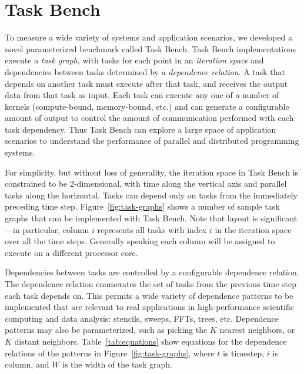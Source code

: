 \section{Task Bench}
\label{sec:task-bench}

To measure a wide variety of
systems and application scenarios, we developed a novel
parameterized benchmark called Task Bench. Task Bench
implementations execute a \emph{task graph}, with tasks for each point
in an \emph{iteration space} and dependencies between tasks determined
by a \emph{dependence relation}. A task that depends on another task
must execute after that task, and receives the output data from that
task as input. Each task can execute any one of a
number of kernels (compute-bound, memory-bound, etc.) and can generate
a configurable amount of output to control the amount of communication
performed with each task dependency. Thus Task Bench can explore a large space of application scenarios to
understand the performance of parallel and
distributed programming systems.

For simplicity, but without loss of generality, the iteration space in
Task Bench is constrained to be 2-dimensional, with time along
the vertical axis and parallel tasks along the
horizontal. Tasks can depend only on tasks from the immediately
preceding time step. Figure~\ref{fig:task-graphs} shows a number of sample task
graphs that can be implemented with Task Bench. Note that layout is
significant---in particular, column $i$ represents all tasks
with index $i$ in the iteration space over all the time
steps. Generally speaking each column will be
assigned to execute on a different processor core.

Dependencies between tasks are controlled by a configurable dependence
relation. The
dependence relation enumerates the set of tasks from the
previous time step each task depends on. This permits a wide variety
of dependence patterns to be implemented that are relevant to real
applications in high-performance scientific computing and data analysis: stencils,
sweeps, FFTs, trees, etc. Dependence patterns may also be
parameterized, such as picking the $K$ nearest neighbors, or $K$
distant neighbors. Table~\ref{tab:equations} show equations for the
dependence relations of the patterns in Figure~\ref{fig:task-graphs},
where $t$ is timestep, $i$ is column, and $W$ is the width of the task
graph.

